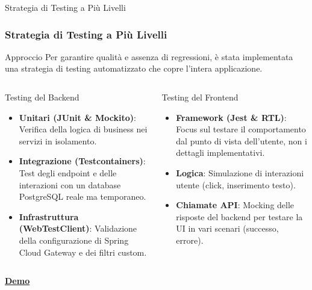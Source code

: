 \documentclass[8pt]{beamer}
\begin{document}

\begin{frame}{Strategia di Testing a Più Livelli}
  \frametitle{Strategia di Testing a Più Livelli}

  \begin{block}{Approccio}
    Per garantire qualità e assenza di regressioni, è stata implementata una strategia di testing automatizzato che copre l'intera applicazione.
  \end{block}

  \begin{columns}[T]
    \begin{exampleblock}{Testing del Backend}
      \begin{itemize}
        \item \textbf{Unitari (JUnit \& Mockito)}: Verifica della logica di business nei servizi in isolamento.
        \item \textbf{Integrazione (Testcontainers)}: Test degli endpoint e delle interazioni con un database PostgreSQL reale ma temporaneo.
        \item \textbf{Infrastruttura (WebTestClient)}: Validazione della configurazione di Spring Cloud Gateway e dei filtri custom.
      \end{itemize}
    \end{exampleblock}

    \begin{exampleblock}{Testing del Frontend}
      \begin{itemize}
        \item \textbf{Framework (Jest \& RTL)}: Focus sul testare il comportamento dal punto di vista dell'utente, non i dettagli implementativi.
        \item \textbf{Logica}: Simulazione di interazioni utente (click, inserimento testo).
        \item \textbf{Chiamate API}: Mocking delle risposte del backend per testare la UI in vari scenari (successo, errore).
      \end{itemize}
    \end{exampleblock}
  \end{columns}
\end{frame}

\begin{frame}[standout]
    \centering
    \href{run:demo.webm}{
        \Huge\bfseries Demo
    }
\end{frame}
\end{document}
